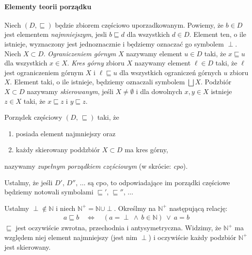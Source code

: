 \paragraph{Elementy teorii porządku} 
Niech \((D,\sqsubseteq)\) będzie zbiorem częściowo uporzadkowanym. Powiemy, że \(b\in D\) jest elementem \emph{najmniejszym}, jesli \(b\sqsubseteq d\) dla wszystkich \(d\in D\). Element ten, o ile istnieje, wyznaczony jest jednoznacznie i będziemy oznaczać go symbolem \(\perp\). Niech \(X\subset D\). \emph{Ograniczeniem górnym} \(X\) nazywamy element \(u\in D\) taki, że \(x\sqsubseteq u\) dla wszystkich \(x\in X\). \emph{Kres górny} zbioru \(X\) nazywamy element \(\ell\in D\) taki, że \(\ell\) jest ograniczeniem górnym \(X\) i \(\ell\sqsubseteq u\) dla wszystkich ograniczeń górnych \(u\) zbioru \(X\). Element taki, o ile istnieje, będziemy oznaczali symbolem \(\bigsqcup X\). Podzbiór \(X\subset D\) nazywamy \emph{skierowanym}, jeśli \(X\neq\emptyset\) i dla dowolnych \(x, y\in X\) istnieje \(z\in X\) taki, że \(x\sqsubseteq z\) i \(y\sqsubseteq z\). 

\begin{definicja}%
Porządek częściowy \((D,\,\sqsubseteq)\) taki, że
\begin{enumerate}[label={(\alph*)}, ref={(\alph*)}]
  \setlength\itemsep{0em}
  \item posiada element najmniejszy oraz
  \item każdy skierowany poddzbiór \(X\subset D\) ma kres górny,
\end{enumerate}
  nazywamy \emph{zupełnym porządkiem częściowym} (w skrócie: \emph{cpo}).
\end{definicja}

Ustalmy, że jeśli \(D'\), \(D''\), \(\dots\)  są cpo, to odpowiadające im porządki częściowe będziemy notowali symbolami \(\sqsubseteq'\), \(\sqsubseteq''\), \(\dots\)

\begin{przyklad}\label{ex:scott_d0}
  Ustalmy \(\perp\not\in \mathbb{N}\) i niech \(\mathbb{N}^{+}=\mathbb{N}\cup{\perp}\). Określmy na \(\mathbb{N}^+\) następującą relację:
  \begin{align*}
    a \sqsubseteq b \quad \Leftrightarrow\quad (a=\perp\ \land\ b\in \mathbb{N})\ \lor\ a = b
  \end{align*}
  \(\sqsubseteq\) jest oczywiście zwrotna, przechodnia i antysymetryczna. Widzimy, że \(\mathbb{N}^{+}\) ma względem niej element najmniejszy (jest nim  \(\perp\)) i oczywiście każdy podzbiór \(\mathbb{N}^{+}\) jest skierowany. 
\end{przyklad}

